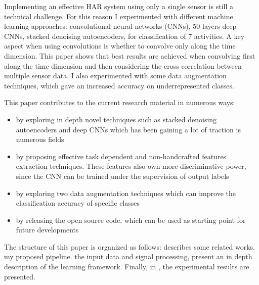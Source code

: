 Implementing an effective HAR system using only a single sensor is still a technical challenge. For this reason I experimented with different machine learning approaches: convolutional neural networks (CNNs), 50 layers deep CNNs, stacked denoising autoencoders, for classification of 7 activities.
A key aspect when using convolutions is whether to convolve only along the time dimension. This paper shows that best results are achieved when convolving first along the time dimension and then considering the cross correlation between multiple sensor data.
I also experimented with some data augmentation techniques, which gave an increased accuracy on underrepresented classes.\par

This paper contributes to the current research material in numerous ways:
\begin{itemize}
\item by exploring in depth novel techniques such as stacked denoising autoencoders and deep CNNs which has been gaining a lot of traction is numerous fields
\item by proposing effective task dependent and \mbox{non-handcrafted} features extraction techniques. These features also own more discriminative power, since the CNN can be trained under the supervision of output labels
\item by exploring two data augmentation techniques which can improve the classification accuracy of specific classes
\item by releasing the open source code, which can be used as starting point for future developments
\end{itemize}

The structure of this paper is organized as follows:  describes some related works.  my proposed pipeline.  the input data and signal processing,  present an in depth description of the learning framework. Finally, in , the experimental results are presented.